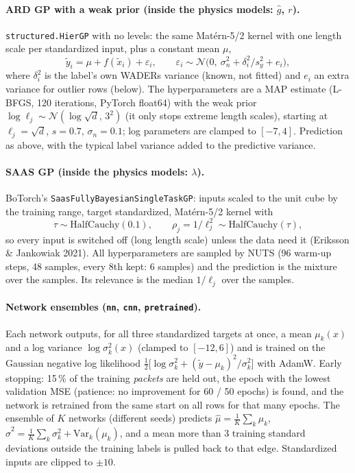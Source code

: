 \paragraph{ARD GP with a weak prior (inside the physics models: $\hat g$, $r$).} \texttt{structured.HierGP} with no
levels: the same Mat\'ern-5/2 kernel with one length scale per standardized input, plus a constant mean $\mu$,
\[
\tilde y_i=\mu+f(\tilde x_i)+\varepsilon_i,\qquad \varepsilon_i\sim\mathcal N\big(0,\ \sigma_n^2+\delta_i^2/s_y^2+e_i\big),
\]
where $\delta_i^2$ is the label's own WADERs variance (known, not fitted) and $e_i$ an extra variance for outlier rows
(below). The hyperparameters are a MAP estimate (L-BFGS, 120 iterations, PyTorch float64) with the weak prior
$\log\ell_j\sim\mathcal N(\log\sqrt d,\,3^2)$ (it only stops extreme length scales), starting at $\ell_j=\sqrt d$,
$s=0.7$, $\sigma_n=0.1$; log parameters are clamped to $[-7,4]$. Prediction as above, with the typical label variance
added to the predictive variance.

\paragraph{SAAS GP (inside the physics models: $\lambda$).} BoTorch's \texttt{SaasFullyBayesianSingleTaskGP}: inputs
scaled to the unit cube by the training range, target standardized, Mat\'ern-5/2 kernel with
\[
\tau\sim\text{HalfCauchy}(0.1),\qquad \rho_j=1/\ell_j^2\sim\text{HalfCauchy}(\tau),
\]
so every input is switched off (long length scale) unless the data need it (Eriksson \& Jankowiak 2021). All
hyperparameters are sampled by NUTS (96 warm-up steps, 48 samples, every 8th kept: 6 samples) and the prediction is the
mixture over the samples. Its relevance is the median $1/\ell_j$ over the samples.

\paragraph{Network ensembles (\texttt{nn}, \texttt{cnn}, \texttt{pretrained}).} Each network outputs, for all three
standardized targets at once, a mean $\mu_k(x)$ and a log variance $\log\sigma_k^2(x)$ (clamped to $[-12,6]$) and is
trained on the Gaussian negative log likelihood
$\tfrac12\big[\log\sigma_k^2+(\tilde y-\mu_k)^2/\sigma_k^2\big]$ with AdamW. Early stopping: 15\,\% of the training
\emph{packets} are held out, the epoch with the lowest validation MSE (patience: no improvement for 60 / 50 epochs) is
found, and the network is retrained from the same start on all rows for that many epochs. The ensemble of $K$ networks
(different seeds) predicts $\hat\mu=\tfrac1K\sum_k\mu_k$, $\hat\sigma^2=\tfrac1K\sum_k\sigma_k^2+\mathrm{Var}_k(\mu_k)$,
and a mean more than 3 training standard deviations outside the training labels is pulled back to that edge.
Standardized inputs are clipped to $\pm10$.

